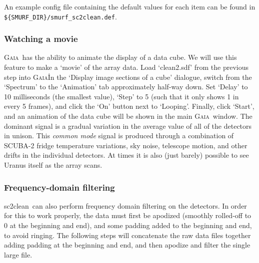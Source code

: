 \documentclass[twoside,11pt]{article}
\newcommand{\xref}[3]{#1}
\newcommand{\xlabel}[1]{}
\renewcommand{\_}{\texttt{\symbol{95}}}
\newcommand{\gaia}{\xref{\textsc{Gaia}}{sun214}{}}
\newcommand{\task}[1]{\textsf{#1}}
\newcommand{\clean}{\xref{\task{sc2clean}}{sun258}{SC2CLEAN}}
\begin{document}
An example config file containing the default values for each item
can be found in \verb|${SMURF_DIR}/smurf_sc2clean.def|.

\subsubsection{\xlabel{movie}Watching a movie}

\gaia\ has the ability to animate the display of a data cube. We will
use this feature to make a `movie' of the array data. Load
`clean2.sdf' from the previous step into \gaia\. In the `Display image
sections of a cube' dialogue, switch from the `Spectrum' to the
`Animation' tab approximately half-way down.  Set `Delay' to 10
milliseconds (the smallest value), `Step' to 5 (such that it only
shows 1 in every 5 frames), and click the `On' button next to
`Looping'. Finally, click `Start', and an animation of the data cube
will be shown in the main \gaia\ window. The dominant signal is a
gradual variation in the average value of all of the detectors in
unison. This {\em common mode} signal is produced through a
combination of SCUBA-2 fridge temperature variations, sky noise,
telescope motion, and other drifts in the individual detectors. At
times it is also (just barely) possible to see Uranus itself as the
array scans.

\subsubsection{\xlabel{fftfilter}Frequency-domain filtering}

\clean\ can also perform frequency domain filtering on the
detectors. In order for this to work properly, the data must first be
apodized (smoothly rolled-off to 0 at the beginning and end), and some
padding added to the beginning and end, to avoid ringing. The
following steps will concatenate the raw data files together adding
padding at the beginning and end, and then apodize and filter the
single large file.
\end{document}
